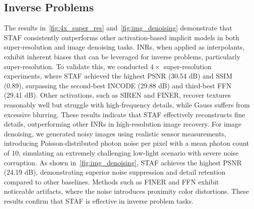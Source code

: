 \subsection{Inverse Problems}
The results in~\cref{fig:4x_super_res} and~\cref{fig:img_denoising} demonstrate that STAF consistently outperforms other activation-based implicit models in both super-resolution and image denoising tasks. INRs, when applied as interpolants, exhibit inherent biases that can be leveraged for inverse problems, particularly super-resolution. To validate this, we conducted $4\times$ super-resolution experiments, where STAF achieved the highest PSNR (30.54 dB) and SSIM (0.89), surpassing the second-best INCODE (29.88 dB) and third-best FFN (29.41 dB). Other activations, such as SIREN and FINER, recover textures reasonably well but struggle with high-frequency details, while Gauss suffers from excessive blurring. These results indicate that STAF effectively reconstructs fine details, outperforming other INRs in high-resolution image recovery. For image denoising, we generated noisy images using realistic sensor measurements, introducing Poisson-distributed photon noise per pixel with a mean photon count of 10, simulating an extremely challenging low-light scenario with severe noise corruption. As shown in~\cref{fig:img_denoising}, STAF achieves the highest PSNR (24.19 dB), demonstrating superior noise suppression and detail retention compared to other baselines. Methods such as FINER and FFN exhibit noticeable artifacts, where the noise introduces proximity color distortions. These results confirm that STAF is effective in inverse problem tasks.
